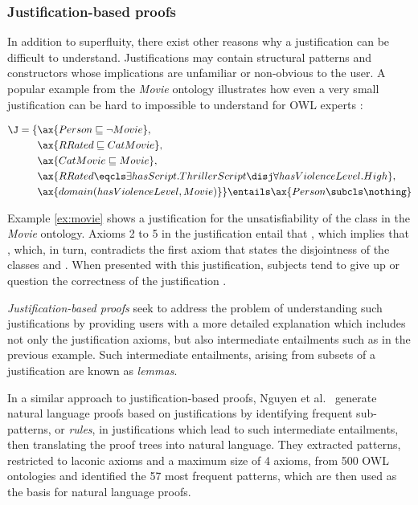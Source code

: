 \subsubsection{Justification-based proofs}
\label{sec:justproofs}
In addition to superfluity, there exist other reasons why a justification can be difficult to understand. Justifications may contain structural patterns and constructors whose implications are unfamiliar or non-obvious to the user. A popular example from the \emph{Movie} ontology illustrates how even a very small justification can be hard to impossible to understand for OWL experts \cite{horridge09zp,horridge10gs}: 
\begin{examp}\begin{align*}
		\J = \{ &\ax{Person \sqsubseteq \neg Movie},\\
		&\ax{RRated \sqsubseteq CatMovie},\\
		&\ax{CatMovie \sqsubseteq Movie},\\
    	&\ax{RRated \eqcls \exists hasScript.ThrillerScript \disj \forall hasViolenceLevel.High},\\
    	&\ax{domain(hasViolenceLevel, Movie)} \} \entails \ax{Person \subcls \nothing}
	\end{align*}\label{ex:movie}\end{examp}
Example \ref{ex:movie} shows a justification for the unsatisfiability of the class  in the \emph{Movie} ontology. Axioms 2 to 5 in the justification entail that , which implies that , which, in turn, contradicts the first axiom that states the disjointness of the classes  and . When presented with this justification, subjects tend to give up or question the correctness of the justification \cite{horridge10gs}.

\emph{Justification-based proofs} seek to address the problem of understanding such justifications by providing users with a more detailed explanation which includes not only the justification axioms, but also intermediate entailments such as  in the previous example. Such intermediate entailments, arising from subsets of a justification \J are known as \emph{lemmas}.

In a similar approach to justification-based proofs, Nguyen et al.\ \cite{nguyen12aa} generate natural language proofs based on justifications by identifying frequent sub-patterns, or \emph{rules}, in justifications which lead to such intermediate entailments, then translating the proof trees into natural language. They extracted patterns, restricted to laconic axioms and a maximum size of 4 axioms, from 500 OWL ontologies and identified the 57 most frequent patterns, which are then used as the basis for natural language proofs.


